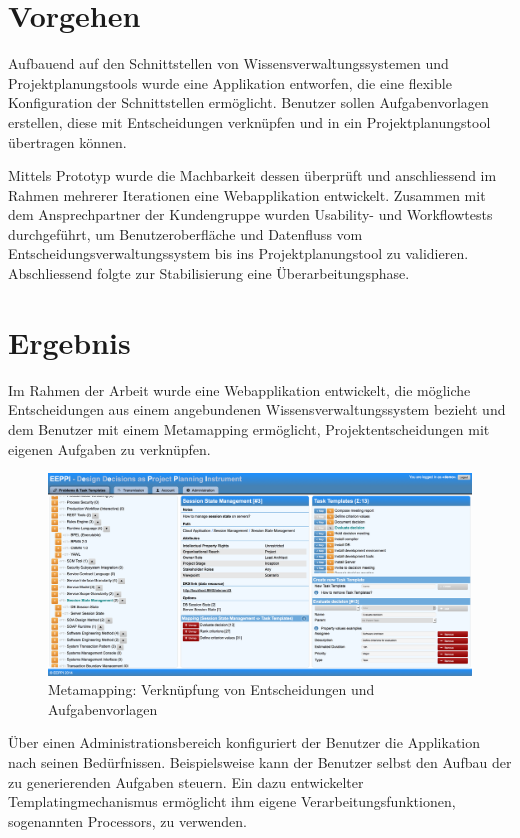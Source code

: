 	
	\section*{Vorgehen}
	
	Aufbauend auf den Schnittstellen von Wissensverwaltungssystemen und Projektplanungstools wurde eine Applikation entworfen,
	die eine flexible Konfiguration der Schnittstellen ermöglicht.
	Benutzer sollen Aufgabenvorlagen erstellen, diese mit Entscheidungen verknüpfen und in ein Projektplanungstool übertragen können.
	
	Mittels Prototyp wurde die Machbarkeit dessen überprüft
	und anschliessend im Rahmen mehrerer Iterationen eine Webapplikation entwickelt.
	Zusammen mit dem Ansprechpartner der Kundengruppe wurden Usability- und Workflowtests durchgeführt, um Benutzeroberfläche
	und Datenfluss vom Entscheidungsverwaltungssystem bis ins Projektplanungstool zu validieren.
	Abschliessend folgte zur Stabilisierung eine Überarbeitungsphase.
	
	
	\section*{Ergebnis}
		
	Im Rahmen der Arbeit wurde eine Webapplikation entwickelt, 
	die mögliche Entscheidungen aus einem angebundenen Wissensverwaltungssystem bezieht
	und dem Benutzer mit einem Metamapping ermöglicht,
	Projektentscheidungen mit eigenen Aufgaben zu verknüpfen.	
	
	\begin{figure}[H]
		\includegraphics[width=\textwidth]{introduction/img/eeppiDecisionsAndTaskTemplates.png}
		\centering
		\caption{Metamapping: Verknüpfung von Entscheidungen und Aufgabenvorlagen}
		\label{fig:metamapping}
	\end{figure}	
	
	Über einen  Administrationsbereich konfiguriert der Benutzer die Applikation nach seinen Bedürfnissen.
	Beispielsweise kann der Benutzer selbst den Aufbau der zu generierenden Aufgaben steuern. 
	Ein dazu entwickelter Templatingmechanismus ermöglicht ihm eigene Verarbeitungsfunktionen, sogenannten Processors, zu verwenden.
	
